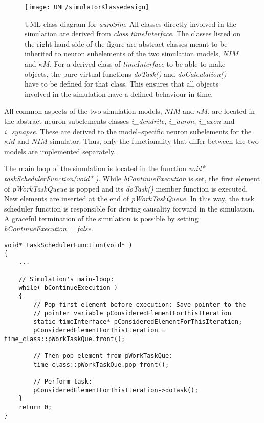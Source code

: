			\begin{figure}[htbp!]
				\centering
				\texttt{[image: UML/simulatorKlassedesign]}
				\caption[UML class diagram of \emph{auroSim}, the neuron simulator designed to compare $NIM$ and $\kappa M$.]{
						UML class diagram for \emph{auroSim}. %
						All classes directly involved in the simulation are derived from \emph{class timeInterface}.
						The classes listed on the right hand side of the figure are abstract classes meant to be inherited to neuron subelements of the two simulation 
							models, $NIM$ and $\kappa M$. 
						For a derived class of \emph{timeInterface} to be able to make objects, the pure virtual  functions \emph{doTask()} and \emph{doCalculation()} have to be defined for that class.
						This ensures that all objects involved in the simulation have a defined behaviour in time.
						}
				\label{figUMLclassDiagramOfSimulator}
			\end{figure}

			All common aspects of the two simulation models, $NIM$ and $\kappa M$, are located in the abstract neuron subelements classes 
				\emph{i\_dendrite}, \emph{i\_auron}, \emph{i\_axon} and \emph{i\_synapse}.
			These are derived to the model--specific neuron subelements for the $\kappa M$ and $NIM$ simulator.
			Thus, only the functionality that differ between the two models are implemented separately. %

			The main loop of the simulation is located in the function \emph{void* taskSchedulerFunction(void* )}.
			While \emph{bContinueExecution} is set, the first element of \emph{pWorkTaskQueue} is popped and its \emph{doTask()} member function is executed.
			New elements are inserted at the end of \emph{pWorkTaskQueue}. %
 			In this way, the task scheduler function is responsible for driving causality forward in the simulation.
			A graceful termination of the simulation is possible by setting \emph{bContinueExecution = false}.

\begin{lstlisting}
void* taskSchedulerFunction(void* )
{
	...
	
    // Simulation's main-loop:
    while( bContinueExecution )
    {
        // Pop first element before execution: Save pointer to the 
		// pointer variable pConsideredElementForThisIteration
        static timeInterface* pConsideredElementForThisIteration;
        pConsideredElementForThisIteration = time_class::pWorkTaskQue.front();

        // Then pop element from pWorkTaskQue:
        time_class::pWorkTaskQue.pop_front();

        // Perform task:
        pConsideredElementForThisIteration->doTask();
    }
    return 0;
}
\end{lstlisting}
			
